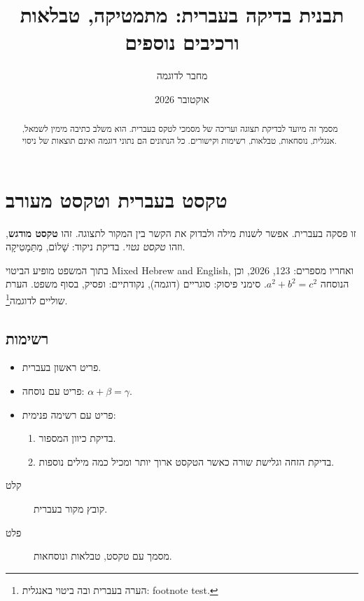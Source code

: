 \documentclass[11pt,a4paper]{article}
\title{תבנית בדיקה בעברית: מתמטיקה, טבלאות ורכיבים נוספים}
\author{מחבר לדוגמה}
\date{אוקטובר 2026}
\begin{document}
\maketitle
\begin{abstract}
מסמך זה מיועד לבדיקת תצוגה ועריכה של מסמכי לטקס בעברית.
הוא משלב כתיבה מימין לשמאל, אנגלית, נוסחאות, טבלאות, רשימות וקישורים.
כל הנתונים הם נתוני דוגמה ואינם תוצאות של ניסוי.
\end{abstract}
\tableofcontents

\section{טקסט בעברית וטקסט מעורב}\label{sec:hebrew}
זו פסקה בעברית. אפשר לשנות מילה ולבדוק את הקשר בין המקור לתצוגה.
זהו \textbf{טקסט מודגש}, וזהו \emph{טקסט נטוי}.
בדיקת ניקוד: שָׁלוֹם, מַתֵּמָטִיקָה.

בתוך המשפט מופיע הביטוי \textenglish{Mixed Hebrew and English},
ואחריו מספרים: 123, 2026, וכן הנוסחה \(a^2+b^2=c^2\).
סימני פיסוק: סוגריים (דוגמה), נקודתיים: ופסיק, בסוף משפט.
הערת שוליים לדוגמה\footnote{הערה בעברית ובה ביטוי באנגלית: \textenglish{footnote test}.}.

\subsection{רשימות}
\begin{itemize}
  \item פריט ראשון בעברית.
  \item פריט עם נוסחה: \(\alpha+\beta=\gamma\).
  \item פריט עם רשימה פנימית:
    \begin{enumerate}
      \item בדיקת כיוון המספור.
      \item בדיקת הזחה וגלישת שורה כאשר הטקסט ארוך יותר ומכיל כמה מילים נוספות.
    \end{enumerate}
\end{itemize}
\begin{description}
  \item[קלט] קובץ מקור בעברית.
  \item[פלט] מסמך עם טקסט, טבלאות ונוסחאות.
\end{description}

\clearpage
\end{document}
